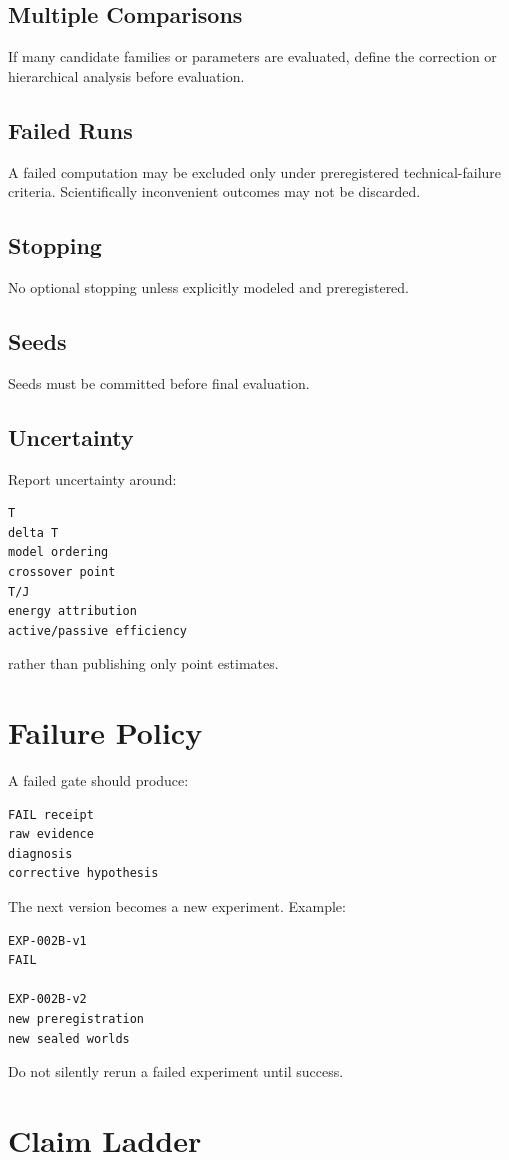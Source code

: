 \documentclass[11pt]{article}
\begin{document}
\subsection*{Multiple Comparisons}
If many candidate families or parameters are evaluated, define the correction or hierarchical analysis before evaluation.

\subsection*{Failed Runs}
A failed computation may be excluded only under preregistered technical-failure criteria. Scientifically inconvenient outcomes may not be discarded.

\subsection*{Stopping}
No optional stopping unless explicitly modeled and preregistered.

\subsection*{Seeds}
Seeds must be committed before final evaluation.

\subsection*{Uncertainty}
Report uncertainty around:
\begin{verbatim}
T
delta T
model ordering
crossover point
T/J
energy attribution
active/passive efficiency
\end{verbatim}
rather than publishing only point estimates.

\section{Failure Policy}

A failed gate should produce:
\begin{verbatim}
FAIL receipt
raw evidence
diagnosis
corrective hypothesis
\end{verbatim}
The next version becomes a new experiment. Example:
\begin{verbatim}
EXP-002B-v1
FAIL

EXP-002B-v2
new preregistration
new sealed worlds
\end{verbatim}
Do not silently rerun a failed experiment until success.

\section{Claim Ladder}
\end{document}
